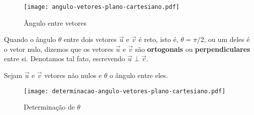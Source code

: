 \begin{figure}[!h]
  \centering
  \caption{\^Angulo entre vetores}
  \texttt{[image: angulo-vetores-plano-cartesiano.pdf]}


\end{figure}


\begin{definicao}
  Quando o \^angulo $\theta$ entre dois vetores $\vec{u}$ e $\vec{v}$ \'e reto, isto \'e, $\theta = \pi/2$, ou um deles \'e o vetor nulo, dizemos que os vetores $\vec{u}$ e $\vec{v}$ s\~ao \textbf{ortogonais} ou \textbf{perpendiculares} entre si. Denotamos tal fato, escrevendo $\vec{u} \perp \vec{v}$.
\end{definicao}

Sejam $\vec{u}$ e $\vec{v}$ vetores n\~ao nulos e $\theta$ o \^angulo entre eles.
\begin{figure}[!h]
  \centering
  \caption{Determina\c{c}\~ao de $\theta$}
  \texttt{[image: determinacao-angulo-vetores-plano-cartesiano.pdf]}


\end{figure}

